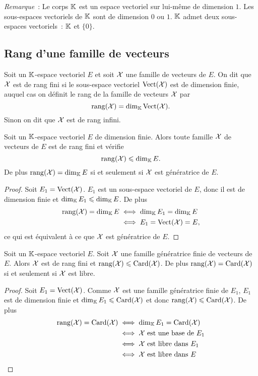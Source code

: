 \emph{Remarque}~: Le corps \(\mathbb{K}\) est un espace vectoriel sur lui-même de dimension \(1\). Les sous-espaces vectoriels de \(\mathbb{K}\) sont de dimension \(0\) ou \(1\). \(\mathbb{K}\) admet deux sous-espaces vectoriels~: \(\mathbb{K}\) et \(\{0\}\).

\subsection{Rang d'une famille de vecteurs}

\begin{defdef}
  Soit un \(\mathbb{K}\)-espace vectoriel \(E\) et soit \(\mathcal{X}\) une famille de vecteurs de \(E\). On dit que \(\mathcal{X}\) est de rang fini si le sous-espace vectoriel \(\operatorname{Vect}(\mathcal{X})\) est de dimension finie, auquel cas on définit le rang de la famille de vecteurs \(\mathcal{X}\) par
  \begin{equation}
    \operatorname{rang}(\mathcal{X})=\operatorname{dim}_{\mathbb{K}} \operatorname{Vect}(\mathcal{X}).
  \end{equation}
  Sinon on dit que \(\mathcal{X}\) est de rang infini.
\end{defdef}

\begin{prop}
  Soit un \(\mathbb{K}\)-espace vectoriel \(E\) de dimension finie. Alors toute famille \(\mathcal{X}\) de vecteurs de \(E\) est de rang fini et vérifie
  \begin{equation}
    \operatorname{rang}(\mathcal{X}) \leqslant \operatorname{dim}_{\mathbb{K}} E.
  \end{equation}
De plus \(\operatorname{rang}(\mathcal{X}) = \operatorname{dim}_{\mathbb{K}} E\) si et seulement si \(\mathcal{X}\) est génératrice de \(E\).
\end{prop}
\begin{proof}
  Soit \(E_1=\operatorname{Vect}(\mathcal{X})\). \(E_1\) est un sous-espace vectoriel de \(E\), donc il est de dimension finie et \(\operatorname{dim}_{\mathbb{K}} E_1 \leqslant \operatorname{dim}_{\mathbb{K}} E\). De plus
  \begin{align}
    \operatorname{rang}(\mathcal{X}) = \operatorname{dim}_{\mathbb{K}} E &\iff \operatorname{dim}_{\mathbb{K}} E_1 = \operatorname{dim}_{\mathbb{K}} E\\
    & \iff E_1=\operatorname{Vect}(\mathcal{X})=E,
  \end{align}
  ce qui est équivalent à ce que \(\mathcal{X}\) est génératrice de \(E\).
\end{proof}

\begin{prop}\label{prop:caracrangbase}
   Soit un \(\mathbb{K}\)-espace vectoriel \(E\). Soit \(\mathcal{X}\) une famille génératrice finie de vecteurs de \(E\). Alors \(\mathcal{X}\) est de rang fini et \(\operatorname{rang}(\mathcal{X}) \leqslant \operatorname{Card}(\mathcal{X})\). De plus \(\operatorname{rang}(\mathcal{X})=\operatorname{Card}(\mathcal{X})\) si et seulement si \(\mathcal{X}\) est libre.
\end{prop}
\begin{proof}
  Soit \(E_1=\operatorname{Vect}(\mathcal{X})\). Comme \(\mathcal{X}\) est une famille génératrice finie de \(E_1\), \(E_1\) est de dimension finie et \(\operatorname{dim}_{\mathbb{K}} E_1 \leqslant \operatorname{Card}(\mathcal{X})\) et donc \(\operatorname{rang}(\mathcal{X}) \leqslant \operatorname{Card}(\mathcal{X})\). De plus 
  \begin{align}
    \operatorname{rang}(\mathcal{X}) = \operatorname{Card}(\mathcal{X}) &\iff \operatorname{dim}_{\mathbb{K}} E_1 = \operatorname{Card}(\mathcal{X})\\
    &\iff \mathcal{X} \text{~est une base de } E_1\\
    &\iff \mathcal{X} \text{~est libre dans } E_1\\
    &\iff \mathcal{X} \text{~est libre dans } E\\
  \end{align}
\end{proof}

